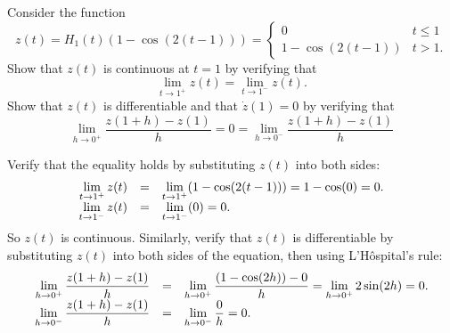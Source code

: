 \documentclass{ximera}
\begin{document}
\begin{exercise}  \label{Ex:cont}
Consider the function
\[
z(t) = H_1(t)(1-\cos(2(t-1))) = \left\{
\begin{array}{cl} 0 & t \leq 1 \\ 1-\cos(2(t-1)) & t > 1. \end{array}\right.
\]
Show that $z(t)$ is continuous at $t=1$ by verifying that 
\[
\lim_{t\to 1^+}z(t) = \lim_{t\to 1^-}z(t).
\]
Show that $z(t)$ is differentiable and that $\dot{z}(1)=0$ by verifying that 
\[
\lim_{h\to 0^+} \frac{z(1+h)-z(1)}{h} = 0 = 
\lim_{h\to 0^-} \frac{z(1+h)-z(1)}{h}
\]

\begin{solution}
Verify that the equality holds by substituting $z(t)$ into
both sides:
\[
\begin{array}{rcl}
\displaystyle \lim_{t \rightarrow 1^{+}}z(t) & = &
\displaystyle \lim_{t \rightarrow 1^{+}}(1 - \cos(2(t - 1))) = 1 - \cos(0) = 0. \\
\displaystyle \lim_{t \rightarrow 1^{-}}z(t) & = &
\displaystyle \lim_{t \rightarrow 1^{-}}(0) = 0.
\end{array}
\]
So $z(t)$ is continuous.  Similarly, verify that $z(t)$ is differentiable
by substituting $z(t)$ into both sides of the equation, then using
L'H\^{o}spital's rule:
\[
\begin{array}{rcl}
\displaystyle \lim_{h \rightarrow 0^{+}}\frac{z(1 + h) - z(1)}{h}
& = & \displaystyle \lim_{h \rightarrow 0^{+}}\frac{(1 - \cos(2h)) - 0}{h}
= \displaystyle \lim_{h \rightarrow 0^{+}}2\sin(2h) = 0. \\
\displaystyle \lim_{h \rightarrow 0^{-}}\frac{z(1 + h) - z(1)}{h}
& = & \displaystyle \lim_{h \rightarrow 0^{-}}\frac{0}{h} = 0.
\end{array}
\]

\end{solution}
\end{exercise}
\end{document}
